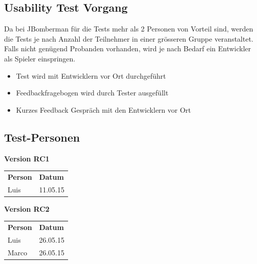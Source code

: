 \documentclass[11pt]{scrartcl}
\begin{document}
\subsection{Usability Test Vorgang}
Da bei JBomberman für die Tests mehr als 2 Personen von Vorteil sind, werden die 
Tests je nach Anzahl der Teilnehmer in einer grösseren Gruppe veranstaltet.
Falls nicht genügend Probanden vorhanden, wird je nach Bedarf ein Entwickler
als Spieler einspringen.
\begin{itemize}
  \item Test wird mit Entwicklern vor Ort durchgeführt
  \item Feedbackfragebogen wird durch Tester ausgefüllt
  \item Kurzes Feedback Gespräch mit den Entwicklern vor Ort
\end{itemize}

\subsection{Test-Personen}
\textbf{Version RC1}
\begin{tabularx}{\linewidth}{l X}
  \bf{Person} & \bf{Datum} \\
  Luis & 11.05.15\\
\end{tabularx}
  \textbf{Version RC2}
\begin{tabularx}{\linewidth}{l X}
  \bf{Person} & \bf{Datum} \\
  Luis & 26.05.15\\
  Marco & 26.05.15\\
\end{tabularx}

\newpage
\end{document}
